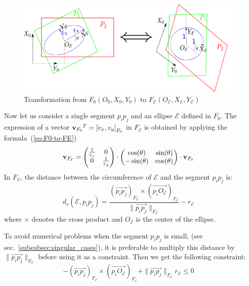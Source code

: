 \begin{figure}[!htb]
  \centering
  \includegraphics[width=0.5\linewidth]{pseudo-distance.pdf}
  \caption{Transformation from $F_0(O_0, X_0, Y_0)$ to $F_\mathcal{E}(O_\mathcal{E},X_\mathcal{E},Y_\mathcal{E})$}
\label{fig:pseudo-distance}
\end{figure}

Now let us consider a single segment $p_i p_j$ and an ellipse $\mathcal{E}$ defined in $F_0$.
The expression of a vector ${{\bf v}_{F_0}}^T = {[v_x, v_y]}_{F_0}$ in $F_\mathcal{E}$ is obtained by applying the formula~(\ref{eq:F0-to-FE})
\begin{equation}
{\bf v}_{F_\mathcal{E}} =
\begin{pmatrix}
\frac{1}{r_x} & 0 \\
0 & \frac{1}{r_y}
\end{pmatrix}
\cdot \begin{pmatrix}
\cos(\theta) & \sin(\theta) \\
-\sin(\theta) & \cos(\theta)
\end{pmatrix}
\cdot {\bf v}_{F_0}
\label{eq:F0-to-FE}
\end{equation}
In $F_\mathcal{E}$, the distance between the circumference of $\mathcal{E}$ and the segment $p_i p_j$ is:
\begin{equation}
	d_s(\mathcal{E}, p_i p_j) = \frac{{\left(\overrightarrow{p_i p_j}\right)}_{F_\mathcal{E}} \times {\left(\overrightarrow{p_i O_\mathcal{E}}\right)}_{F_\mathcal{E}}}{\| \overrightarrow{p_i p_j}\|_{F_\mathcal{E}}}-r_{\mathcal{E}}
\end{equation}
where $\times$ denotes the cross product and $O_{\mathcal{E}}$ is the center of the ellipse.

To avoid numerical problems when the segment $p_i p_j$ is small, (see sec.~\ref{subsubsec:singular_cases}), it is preferable to multiply this distance by $\| \overrightarrow{p_i p_j}\|_{F_\mathcal{E}}$ before using it as a constraint.
Then we get the following constraint:
\begin{equation}
	-{\left(\overrightarrow{p_i p_j}\right)}_{F_\mathcal{E}} \times {\left(\overrightarrow{p_i O_\mathcal{E}}\right)}_{F_\mathcal{E}}+\| \overrightarrow{p_i p_j}\|_{F_\mathcal{E}} r_{\mathcal{E}} \leq 0
\label{eq:pseudo-distance}
\end{equation}

